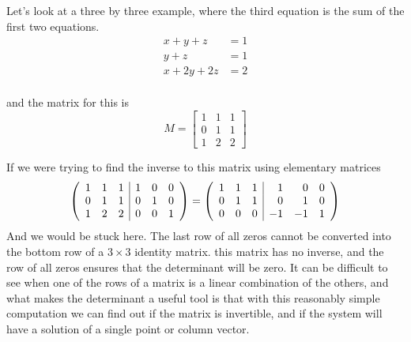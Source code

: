 {Let's look at a three by three example, where the third equation is the sum of the first two equations.
\begin{align*}
x+y + z &= 1\\
y +z &= 1\\
x + 2y+ 2z &= 2\\
\end{align*}

and the matrix for this is 
\[
M =\begin{bmatrix}
1 & 1 &1\\
0 & 1 & 1\\
1 & 2& 2 
\end{bmatrix}
\]

If we were trying to find the inverse to this matrix using elementary matrices
\[ \left( \begin{array}{ccc | ccc}
1 & 1 &1 & 	1 & 0 & 0\\
0 & 1 & 1 & 	0 & 1 & 0 \\
1 & 2 & 2 &	0 & 0 & 1
\end{array} \right) 
=
 \left( \begin{array}{ccc | rrr}
1 & 1 &1 & 	1 & 0 & 0\\
0 & 1 & 1 & 	0 & 1 & 0 \\
0 & 0 & 0 &	-1 & -1 & 1
\end{array} \right) 
\]
And we would be stuck here. The last row of all zeros cannot be converted into the bottom row of a $3 \times 3$ identity matrix. this matrix has no inverse, and the row of all zeros ensures that the determinant will be zero. It can be difficult to see when one of the rows of a matrix is a linear combination of the others, and what makes the determinant a useful tool is that with this reasonably simple computation we can find out if the matrix is invertible, and if the system will have a solution of a single point or column vector. 
} %

